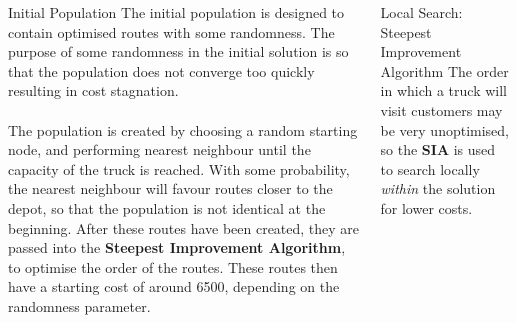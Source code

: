 \documentclass[ %
                    author={Callum Mann},
                     title={Genetic algorithms for the CVRP},
                  subtitle={Capacitated Vehicle Routing Problem},
                      type={Heuristics},
                      year={2016}]{poster}
\begin{document}

\begin{frame}{}


\begin{columns}[t]
  \begin{column}{0.422\linewidth}
  \begin{block}{\Large Initial Population}
  The initial population is designed to contain optimised routes with some randomness. 
  The purpose of some randomness in the initial solution is so that the population does not
  converge too quickly resulting in cost stagnation. \\ \\
  The population is created by choosing a random starting node, and performing nearest neighbour
  until the capacity of the truck is reached. With some probability, the nearest neighbour will favour
  routes closer to the depot, so that the population is not identical at the beginning. After these routes have been
  created, they are passed into the \textbf{Steepest Improvement Algorithm}, to optimise the order of the routes.
  These routes then have a starting cost of around 6500, depending on the randomness parameter.
  \end{block}
  \end{column}

  \begin{column}{0.422\linewidth}
  \begin{block}{\Large Local Search: Steepest Improvement Algorithm}
    The order in which a truck will visit customers may be very unoptimised, so the \textbf{SIA} is used
    to search locally \textit{within} the solution for lower costs. 
  \end{block}
  \end{column}
\end{columns}

\vfill


\end{frame}
\end{document}
